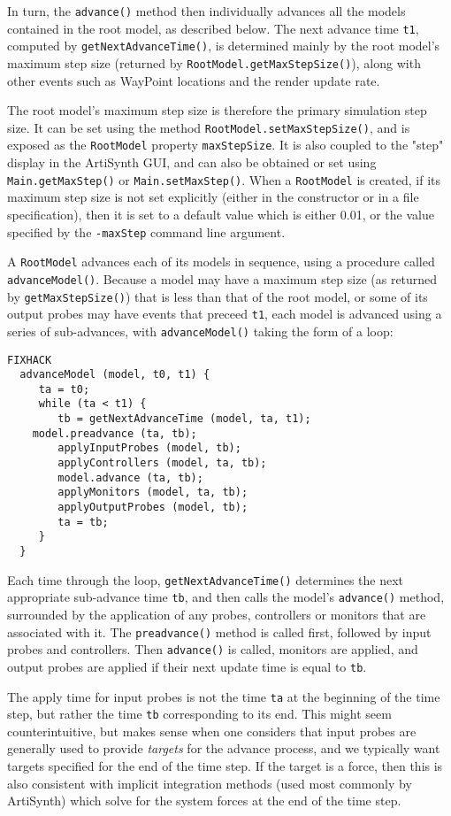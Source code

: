 \documentclass{article}
\begin{document}
In turn, the {\tt advance()} method then individually advances all the
models contained in the root model, as described below.  The next
advance time {\tt t1}, computed by {\tt getNextAdvanceTime()}, is
determined mainly by the root model's maximum step size (returned by
{\tt RootModel.getMaxStep\-Size()}), along with other events such as
WayPoint locations and the render update rate.

The root model's maximum step size is therefore the primary simulation
step size. It can be set using the method
{\tt RootModel.setMaxStepSize()}, and is exposed as the {\tt RootModel}
property {\tt maxStepSize}.  It is also coupled to the "step" display in
the ArtiSynth GUI, and can also be obtained or set using
{\tt Main.getMaxStep()} or {\tt Main.setMaxStep()}. When a {\tt RootModel} is
created, if its maximum step size is not set explicitly (either in the
constructor or in a file specification), then it is set to a default
value which is either 0.01, or the value specified by the {\tt -maxStep}
command line argument.

A {\tt RootModel} advances each of its models in sequence, using a
procedure called {\tt advanceModel()}. Because a model may have a
maximum step size (as returned by {\tt getMaxStepSize()}) that is less
than that of the root model, or some of its output probes may have
events that preceed {\tt t1}, each model is advanced using
a series of sub-advances, with {\tt advanceModel()} taking the
form of a loop:
\begin{lstlisting}FIXHACK
  advanceModel (model, t0, t1) {
     ta = t0;
     while (ta < t1) {
        tb = getNextAdvanceTime (model, ta, t1);
	model.preadvance (ta, tb);
        applyInputProbes (model, tb);
        applyControllers (model, ta, tb);
        model.advance (ta, tb);
        applyMonitors (model, ta, tb);
        applyOutputProbes (model, tb);
        ta = tb;
     }
  }
\end{lstlisting}
Each time through the loop, {\tt getNextAdvanceTime()} determines the
next appropriate sub-advance time {\tt tb}, and then calls the model's
{\tt advance()} method, surrounded by the application of any probes,
controllers or monitors that are associated with it.
The {\tt preadvance()} method is called first, followed
by input probes and controllers.
Then {\tt advance()} is called, monitors are applied, and
output probes are applied if their next update time is equal to
{\tt tb}.

\begin{sideblock}
The apply time for input probes is not the time {\tt ta}
at the beginning of the time step, but rather the time {\tt tb}
corresponding to its end. This might seem
counterintuitive, but makes sense when one considers that
input probes are generally used to provide {\it targets}
for the advance process, and we typically want targets
specified for the end of the time step. If the target is a force,
then this is also consistent with implicit integration methods (used
most commonly by ArtiSynth) which solve for the system forces
at the end of the time step.
\end{sideblock}
\end{document}
